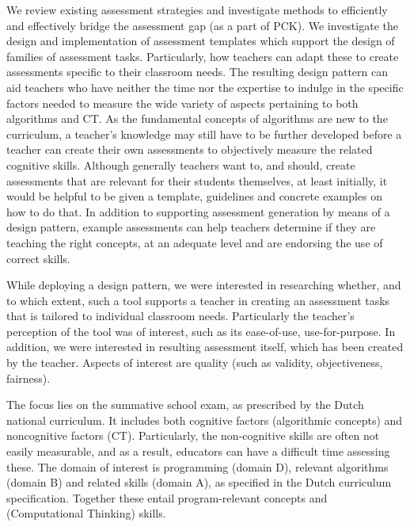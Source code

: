 

We review existing assessment strategies and investigate methods to efficiently and effectively bridge the assessment gap (as a part of PCK). We investigate the design and implementation of assessment templates which support the design of families of assessment tasks. Particularly, how teachers can adapt these to create assessments specific to their classroom needs. The resulting design pattern can aid teachers who have neither the time nor the expertise to indulge in the specific factors needed to measure the wide variety of aspects pertaining to both algorithms and CT. As the fundamental concepts of algorithms are new to the curriculum, a teacher’s knowledge may still have to be further developed before a teacher can create their own assessments to objectively measure the related cognitive skills. Although generally teachers want to, and should, create assessments that are relevant for their students themselves, at least initially, it would be helpful to be given a template, guidelines and concrete examples on how to do that. In addition to supporting assessment generation by means of a design pattern, example assessments can help teachers determine if they are teaching the right concepts, at an adequate level and are endorsing the use of correct skills.

While deploying a design pattern, we were interested in researching whether, and to which extent, such a tool supports a teacher in creating an assessment tasks that is tailored to individual classroom needs. Particularly the teacher’s perception of the tool was of interest, such as its ease-of-use, use-for-purpose. In addition, we were interested in resulting assessment itself, which has been created by the teacher. Aspects of interest are quality (such as validity, objectiveness, fairness).

The focus lies on the summative school exam, as prescribed by the Dutch national curriculum. It includes both cognitive factors (algorithmic concepts) and noncognitive factors (CT).  Particularly, the non-cognitive skills are often not easily measurable, and as a result, educators can have a difficult time assessing these. The domain of interest is programming (domain D), relevant algorithms (domain B) and related skills (domain A), as specified in the Dutch curriculum specification. Together these entail program-relevant concepts and (Computational Thinking) skills.



